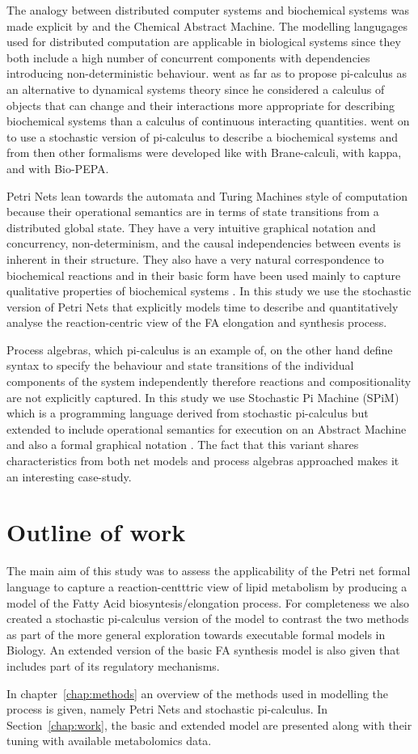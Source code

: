 The analogy between distributed computer systems and biochemical
systems was made explicit by \citet{berry1989chemical} and the
Chemical Abstract Machine. The modelling langugages used for
distributed computation are applicable in biological systems since
they both include a high number of concurrent components with dependencies
introducing non-deterministic behaviour. \citet{fontana1996barrier} went as far as
to propose pi-calculus as an alternative to dynamical systems
theory since he considered a calculus of objects that can change and their
interactions more appropriate for describing biochemical systems than a calculus of continuous
interacting quantities. \citet{priami2001application} went on to use a
stochastic version of pi-calculus to describe a biochemical systems
and from then other formalisms were developed like
\citet{cardelli2005brane} with Brane-calculi, \citet{danos2004formal}
with kappa, and
\citet{ciocchetta2009bio} with Bio-PEPA.

Petri Nets lean towards the automata and Turing Machines style of
computation because their operational semantics are in terms of state
transitions from a distributed global state. They have a very intuitive
graphical notation and concurrency,
non-determinism, and the causal independencies between events is
inherent in their structure. They
also have a very natural correspondence to biochemical reactions and
in their basic form have been used mainly to capture qualitative properties
of biochemical systems \cite [] {baldan2010petri}. In this study we use the stochastic version of
Petri Nets that explicitly models time to describe and quantitatively
analyse the
reaction-centric view of the FA elongation and synthesis
process.

Process algebras, which pi-calculus is an example of, on the other
hand define syntax to specify the behaviour and state transitions of the individual
components of the system independently therefore reactions and
compositionality are not explicitly captured. In this study we
use Stochastic Pi Machine (SPiM) which is a programming
language derived from stochastic pi-calculus but extended to include
operational semantics for execution on an Abstract Machine and also a
formal graphical notation \cite [] {export:65224, export:65223}. The
fact that this variant shares
characteristics from both net models and process algebras approached
makes it an interesting case-study.

\section{Outline of work}
The main aim of this study was to assess the
applicability of the Petri net formal language to capture a
reaction-centttric view of lipid metabolism by producing a model of the
Fatty Acid biosyntesis/elongation process. For completeness we also
created a stochastic pi-calculus version of the model to contrast the
two methods as part of the more general exploration towards executable
formal models in Biology. An extended version of the basic FA
synthesis model is
also given that includes part of its regulatory mechanisms.

In chapter~\ref{chap:methods} an overview of the methods used in
modelling the process is given, namely Petri Nets and stochastic
pi-calculus. In Section~\ref{chap:work}, the basic and extended model
are presented along with their tuning with available metabolomics
data. 

